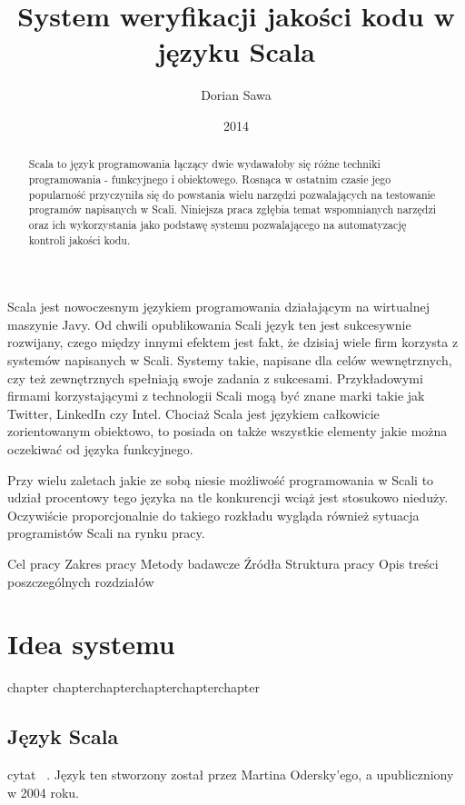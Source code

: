 \documentclass[brudnopis]{xmgr}
\author   {Dorian Sawa}
\title    {System weryfikacji jakości kodu w języku Scala}
\date     {2014}
\begin{document}
\begin{abstract}
 Scala to język programowania łączący dwie wydawałoby się różne techniki programowania - funkcyjnego i obiektowego. 
Rosnąca w ostatnim czasie jego popularność przyczyniła się do powstania wielu narzędzi pozwalających na testowanie 
programów napisanych w Scali. Niniejsza praca zgłębia temat wspomnianych narzędzi oraz ich wykorzystania jako podstawę 
systemu pozwalającego na automatyzację kontroli jakości kodu.
\end{abstract}

\maketitle
%
\introduction

Scala jest nowoczesnym językiem programowania działającym na wirtualnej maszynie Javy. Od chwili opublikowania Scali język ten jest sukcesywnie rozwijany, czego między innymi efektem jest fakt, że dzisiaj wiele firm korzysta z systemów napisanych w Scali. Systemy takie, napisane dla celów wewnętrznych, czy też zewnętrznych spełniają swoje zadania z sukcesami. Przykładowymi firmami korzystającymi z technologii Scali mogą być znane marki takie jak Twitter, LinkedIn czy Intel. Chociaż Scala jest językiem całkowicie zorientowanym obiektowo, to posiada on także wszystkie elementy jakie można oczekiwać od języka funkcyjnego. 

Przy wielu zaletach jakie ze sobą niesie możliwość programowania w Scali to udział procentowy tego języka na tle konkurencji wciąż jest stosukowo nieduży. Oczywiście proporcjonalnie do takiego rozkładu wygląda również sytuacja programistów Scali na rynku pracy. 

Cel pracy
Zakres pracy
Metody badawcze
Źródła
Struktura pracy
Opis treści poszczególnych rozdziałów

\chapter{Idea systemu}

chapter chapterchapterchapterchapterchapter 

\section{Język Scala}

cytat ~\cite[s.~123]{Elmasri:2002:CMC}. 
Język ten stworzony został przez Martina Odersky'ego, a upubliczniony w 2004 roku.
\end{document}
